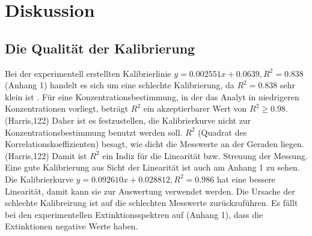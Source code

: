 \documentclass[12pt]{article}
\begin{document}
\section{Diskussion}
\subsection{Die Qualität der Kalibrierung}
Bei der experimentell erstellten Kalibrierlinie $y=0.002551x+0.0639, R^2 = 0.838$ (Anhang 1) handelt
es sich um eine schlechte Kalibrierung, da $R^2 = 0.838$ sehr klein ist .
Für eine Konzentrationsbestimmung, in der das Analyt in niedrigeren Konzentrationen vorliegt,
beträgt $R^2$ ein akzeptierbarer Wert von $R^2 \geq 0.98$. (Harris,122) Daher ist es festzustellen, die Kalibrierkurve
nicht zur Konzentrationsbestimmung benutzt werden soll.
$R^2$ (Quadrat des Korrelationskoeffizienten) besagt, wie dicht die Messwerte an der Geraden liegen. (Harris,122)
Damit ist $R^2$ ein Indiz für die Linearität bzw. Streuung der Messung.
Eine gute Kalibrierung aus Sicht der Linearität ist auch am Anhang 1 zu sehen.
Die Kalibrierkurve $y = 0.092610x + 0.028812, R^2 = 0.986$ hat eine bessere Linearität, damit kann sie
zur Auswertung verwendet werden. Die Ursache der schlechte Kalibreirung ist auf die schlechten Messwerte zurückzuführen.
Es fällt bei den experimentellen Extinktionsspektren auf (Anhang 1), dass die Extinktionen negative Werte haben.
\end{document}

